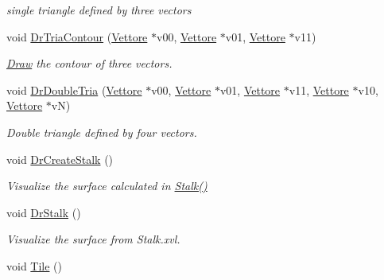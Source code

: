 \begin{DoxyCompactItemize}
\begin{DoxyCompactList}\small\item\em single triangle defined by three vectors \end{DoxyCompactList}\item 
\hypertarget{classElPoly_ad7b11c55a050b47140f4063d6ad80756}{void \hyperlink{classElPoly_ad7b11c55a050b47140f4063d6ad80756}{\-Dr\-Tria\-Contour} (\hyperlink{classVettore}{\-Vettore} $\ast$v00, \hyperlink{classVettore}{\-Vettore} $\ast$v01, \hyperlink{classVettore}{\-Vettore} $\ast$v11)}\label{classElPoly_ad7b11c55a050b47140f4063d6ad80756}

\begin{DoxyCompactList}\small\item\em \hyperlink{classDraw}{\-Draw} the contour of three vectors. \end{DoxyCompactList}\item 
\hypertarget{classElPoly_a4f733cc712ac229489bff59b4b4f8c58}{void \hyperlink{classElPoly_a4f733cc712ac229489bff59b4b4f8c58}{\-Dr\-Double\-Tria} (\hyperlink{classVettore}{\-Vettore} $\ast$v00, \hyperlink{classVettore}{\-Vettore} $\ast$v01, \hyperlink{classVettore}{\-Vettore} $\ast$v11, \hyperlink{classVettore}{\-Vettore} $\ast$v10, \hyperlink{classVettore}{\-Vettore} $\ast$v\-N)}\label{classElPoly_a4f733cc712ac229489bff59b4b4f8c58}

\begin{DoxyCompactList}\small\item\em \-Double triangle defined by four vectors. \end{DoxyCompactList}\item 
\hypertarget{classElPoly_a62e3f72464b15b655d7c683ad3c1393f}{void \hyperlink{classElPoly_a62e3f72464b15b655d7c683ad3c1393f}{\-Dr\-Create\-Stalk} ()}\label{classElPoly_a62e3f72464b15b655d7c683ad3c1393f}

\begin{DoxyCompactList}\small\item\em \-Visualize the surface calculated in \hyperlink{classVarData_a7521c027e75a7b726b1afb9f800301f6}{\-Stalk()} \end{DoxyCompactList}\item 
\hypertarget{classElPoly_a1003dbb97e1d997e641cc0b8c4d82ba2}{void \hyperlink{classElPoly_a1003dbb97e1d997e641cc0b8c4d82ba2}{\-Dr\-Stalk} ()}\label{classElPoly_a1003dbb97e1d997e641cc0b8c4d82ba2}

\begin{DoxyCompactList}\small\item\em \-Visualize the surface from \-Stalk.\-xvl. \end{DoxyCompactList}\item 
\hypertarget{classElPoly_a936b5ae489361c88bca90698f6316f27}{void \hyperlink{classElPoly_a936b5ae489361c88bca90698f6316f27}{\-Tile} ()}\label{classElPoly_a936b5ae489361c88bca90698f6316f27}


\end{DoxyCompactItemize}
